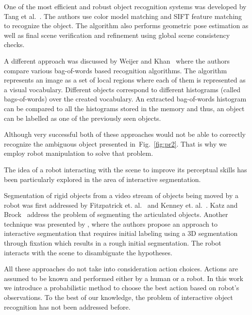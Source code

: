 \documentclass[conference]{IEEEtran}
\newcommand{\figref}[1]{Fig.~\ref{#1}}
\begin{document}
	One of the most efficient and robust object recognition systems was developed by Tang et al.~\cite{tang2012textured}. The authors use color model matching and SIFT feature matching to recognize the object. The algorithm also performs geometric pose estimation as well as final scene verification and refinement using global scene consistency checks. 

    A different approach was discussed by Weijer and Khan~\cite{van2013fusing} where the authors compare various bag-of-words based recognition algorithms. The algorithm represents an image as a set of local regions where each of them is represented as a visual vocabulary. Different objects correspond to different histograms (called bags-of-words) over the created vocabulary. An extracted bag-of-words histogram can be compared to all the histograms stored in the memory and thus, an object can be labelled as one of the previously seen objects.

    Although very successful both of these approaches would not be able to correctly recognize the ambiguous object presented in~\figref{fig:pr2}. That is why we employ robot manipulation to solve that problem.

    The idea of a robot interacting with the scene to improve its perceptual skills has been particularly explored in the area of interactive segmentation.

    Segmentation of rigid objects from a video stream of objects being moved by a robot was first addressed by Fitzpatrick et. al.~\cite{fitzpatrick_active_vision} and Kenney et. al.~\cite{KenneyInteractive}. Katz and Brock~\cite{Katz-WS-MM-ICRA2011} address the problem of segmenting the articulated objects. Another technique was presented by \cite{bergstrom11icvs}, where the authors propose an approach to interactive segmentation that requires initial labeling using  a 3D segmentation through fixation which results in a rough initial segmentation. The robot interacts with the scene to disambiguate the hypotheses.


    All these approaches do not take into consideration action choices. Actions are assumed to be known and performed either by a human or a robot. In this work we introduce a probabilistic method to choose the best action based on robot's observations. To the best of our knowledge, the problem of interactive object recognition has not been addressed before. 
\end{document}
